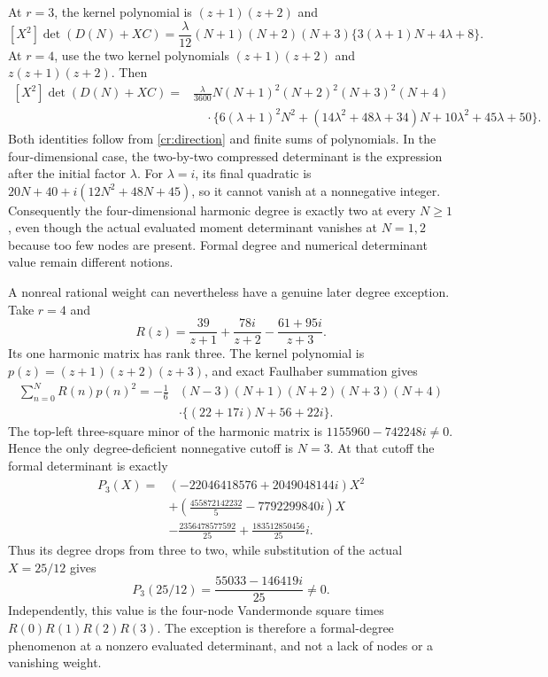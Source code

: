 At $r=3$, the kernel polynomial is $(z+1)(z+2)$ and
\begin{equation}\label{cr:three}
 \boxed{
 [X^2]\det(D(N)+XC)=
 \frac{\lambda}{12}(N+1)(N+2)(N+3)
       \{3(\lambda+1)N+4\lambda+8\}.}
\end{equation}
At $r=4$, use the two kernel polynomials
$(z+1)(z+2)$ and $z(z+1)(z+2)$.  Then
\begin{equation}\label{cr:four}
 \begin{split}
 [X^2]\det(D(N)+XC)
 ={}&\frac{\lambda}{3600}N(N+1)^2(N+2)^2(N+3)^2(N+4)\\
 &\quad\cdot\bigl\{6(\lambda+1)^2N^2
 +(14\lambda^2+48\lambda+34)N
 +10\lambda^2+45\lambda+50\bigr\}.
 \end{split}
\end{equation}
Both identities follow from \eqref{cr:direction} and finite sums of
polynomials.  In the four-dimensional case, the two-by-two compressed
determinant is the expression after the initial factor $\lambda$.
For $\lambda=i$, its final quadratic is
$20N+40+i(12N^2+48N+45)$, so it cannot vanish at a nonnegative
integer.  Consequently the four-dimensional harmonic degree is
exactly two at every $N\ge1$, even though the actual evaluated
moment determinant vanishes at $N=1,2$ because too few nodes are
present.  Formal degree and numerical determinant value remain
different notions.

A nonreal rational weight can nevertheless have a genuine later
degree exception.  Take $r=4$ and
\begin{equation}\label{cr:exception-weight}
 R(z)=\frac{39}{z+1}+\frac{78i}{z+2}
                        -\frac{61+95i}{z+3}.
\end{equation}
Its one harmonic matrix has rank three.  The kernel polynomial is
$p(z)=(z+1)(z+2)(z+3)$, and exact Faulhaber summation gives
\begin{equation}\label{cr:exception-compression}
 \begin{split}
 \sum_{n=0}^N R(n)p(n)^2
  =-\frac16&(N-3)(N+1)(N+2)(N+3)(N+4)\\
           &\cdot\{(22+17i)N+56+22i\}.
 \end{split}
\end{equation}
The top-left three-square minor of the harmonic matrix is
$1155960-742248i\ne0$.  Hence the only degree-deficient
nonnegative cutoff is $N=3$.  At that cutoff the formal determinant
is exactly
\begin{equation}\label{cr:exception-polynomial}
 \begin{split}
 P_3(X)={}&(-22046418576+2049048144i)X^2\\
 &+\left(\frac{455872142232}{5}-7792299840i\right)X\\
 &-\frac{2356478577592}{25}
                         +\frac{183512850456}{25}i.
 \end{split}
\end{equation}
Thus its degree drops from three to two, while substitution of the
actual $X=25/12$ gives
\[
 P_3(25/12)=\frac{55033-146419i}{25}\ne0.
\]
Independently, this value is the four-node Vandermonde square times
$R(0)R(1)R(2)R(3)$.  The exception is therefore a formal-degree
phenomenon at a nonzero evaluated determinant, and not a lack of
nodes or a vanishing weight.

